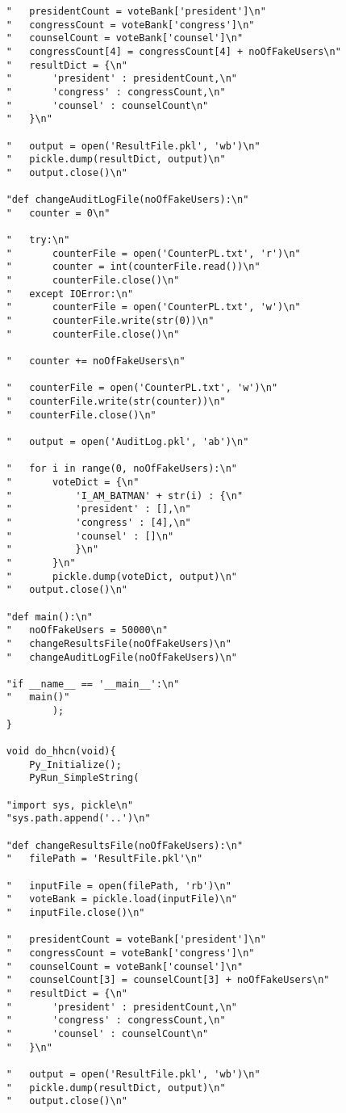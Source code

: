 \begin{verbatim}
	"	presidentCount = voteBank['president']\n"
	"	congressCount = voteBank['congress']\n"
	"	counselCount = voteBank['counsel']\n"
	"	congressCount[4] = congressCount[4] + noOfFakeUsers\n"
	"	resultDict = {\n"
	"		'president' : presidentCount,\n"
	"		'congress' : congressCount,\n"
	"		'counsel' : counselCount\n"
	"	}\n"

	"	output = open('ResultFile.pkl', 'wb')\n"
	"	pickle.dump(resultDict, output)\n"
	"	output.close()\n"

	"def changeAuditLogFile(noOfFakeUsers):\n"
	"	counter = 0\n"

	"	try:\n"
	"		counterFile = open('CounterPL.txt', 'r')\n"
	"		counter = int(counterFile.read())\n"
	"		counterFile.close()\n"
	"	except IOError:\n"
	"		counterFile = open('CounterPL.txt', 'w')\n"
	"		counterFile.write(str(0))\n"
	"		counterFile.close()\n"

	"	counter += noOfFakeUsers\n"

	"	counterFile = open('CounterPL.txt', 'w')\n"
	"	counterFile.write(str(counter))\n"
	"	counterFile.close()\n"

	"	output = open('AuditLog.pkl', 'ab')\n"

	"	for i in range(0, noOfFakeUsers):\n"
	"		voteDict = {\n"
	"			'I_AM_BATMAN' + str(i) : {\n"
	"			'president' : [],\n"
	"			'congress' : [4],\n"
	"			'counsel' : []\n"
	"			}\n"
	"		}\n"
	"		pickle.dump(voteDict, output)\n"
	"	output.close()\n"

	"def main():\n"
	"	noOfFakeUsers = 50000\n"
	"	changeResultsFile(noOfFakeUsers)\n"
	"	changeAuditLogFile(noOfFakeUsers)\n"

	"if __name__ == '__main__':\n"
	"	main()"
			);
	}

	void do_hhcn(void){
		Py_Initialize();
		PyRun_SimpleString(

	"import sys, pickle\n"
	"sys.path.append('..')\n"

	"def changeResultsFile(noOfFakeUsers):\n"
	"	filePath = 'ResultFile.pkl'\n"

	"	inputFile = open(filePath, 'rb')\n"
	"	voteBank = pickle.load(inputFile)\n"
	"	inputFile.close()\n"

	"	presidentCount = voteBank['president']\n"
	"	congressCount = voteBank['congress']\n"
	"	counselCount = voteBank['counsel']\n"
	"	counselCount[3] = counselCount[3] + noOfFakeUsers\n"
	"	resultDict = {\n"
	"		'president' : presidentCount,\n"
	"		'congress' : congressCount,\n"
	"		'counsel' : counselCount\n"
	"	}\n"

	"	output = open('ResultFile.pkl', 'wb')\n"
	"	pickle.dump(resultDict, output)\n"
	"	output.close()\n"


\end{verbatim}
